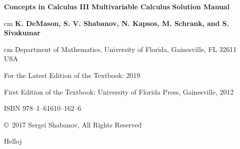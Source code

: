 \documentclass[12pt]{amsbook}
\begin{document}
\thispagestyle{empty}

\begin{center}
{\huge\bf Concepts in Calculus III}
\vskip 0.5cm
{\LARGE\bf Multivariable Calculus}
\vskip 0.5cm
{\huge\bf Solution Manual}

 cm
{\Large\bf K. DeMason, S. V. Shabanov, N. Kapsos, M. Schrank, and S. Sivakumar}

 cm
{\large\sf Department of Mathematics, University of Florida, Gainesville, FL 32611
USA}

\end{center}
\vskip 5cm
\begin{center}
For the Latest Edition of the Textbook: 2019

First Edition of the Textbook:
University of Florida Press, Gainesville, 2012

ISBN 978--1--61610--162--6 

\vskip 1cm
{\small\sf\copyright\ 2017 Sergei Shabanov,   All Rights Reserved}
\end{center}

\newpage
Helloj
\end{document}
